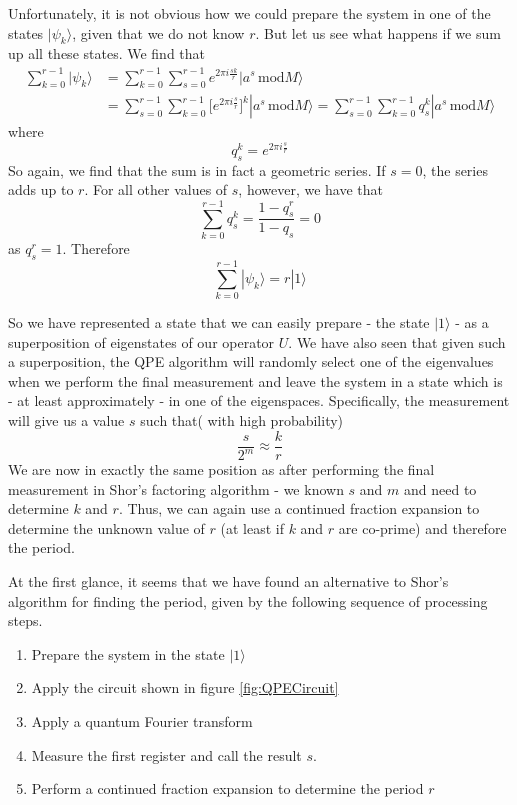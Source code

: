 \documentclass[a4paper, draft]{article}
\theoremstyle{own}
\theoremstyle{remark}
\begin{document}
Unfortunately, it is not obvious how we could prepare the system in one of the states $|\psi_k \rangle$, given that we do not know $r$. But let us see what happens if we sum up all these states. We find that
\begin{align*}
\sum_{k=0}^{r-1} |\psi_k \rangle &= \sum_{k=0}^{r-1} \sum_{s=0}^{r-1} e^{2\pi i \frac{sk}{r}} |a^s \, \text{mod} M \rangle \\
&= \sum_{s=0}^{r-1}  \sum_{k=0}^{r-1} \big[ e^{2\pi i \frac{s}{r}} \big]^k  |a^s \, \text{mod} M \rangle 
= \sum_{s=0}^{r-1}  \sum_{k=0}^{r-1} q_s^k  |a^s \, \text{mod} M \rangle
\end{align*}
where
$$
q_s^k =  e^{2\pi i \frac{s}{r}}
$$
So again, we find that the sum is in fact a geometric series. If $s=0$, the series adds up to $r$. For all other values of $s$, however, we have that
$$
\sum_{k=0}^{r-1} q_s^k = \frac{1 - q_s^r}{1-q_s} = 0
$$
as $q_s^r = 1$. Therefore
$$
\sum_{k=0}^{r-1} |\psi_k \rangle = r |1 \rangle
$$

So we have represented a state that we can easily prepare - the state $|1 \rangle$ - as a superposition of eigenstates of our operator $U$. We have also seen that given such a superposition, the QPE algorithm will randomly select one of the eigenvalues when we perform the final measurement and leave the system in a state which is - at least approximately - in one of the eigenspaces. Specifically, the measurement will give us a value $s$ such that( with high probability)
$$
\frac{s}{2^m} \approx \frac{k}{r}
$$
We are now in exactly the same position as after performing the final measurement in Shor's factoring algorithm - we known $s$ and $m$ and need to determine $k$ and $r$. Thus, we can again use a continued fraction expansion to determine the unknown value of $r$ (at least if $k$ and $r$ are co-prime) and therefore the period.

At the first glance, it seems that we have found an alternative to Shor's algorithm for finding the period, given by the following sequence of processing steps.

\begin{enumerate}
	\item Prepare the system in the state $|1 \rangle$
	\item Apply the circuit shown in figure \ref{fig:QPECircuit} 
	\item Apply a quantum Fourier transform
	\item Measure the first register and call the result $s$. 
	\item Perform a continued fraction expansion to determine the period $r$
\end{enumerate}
\end{document}
